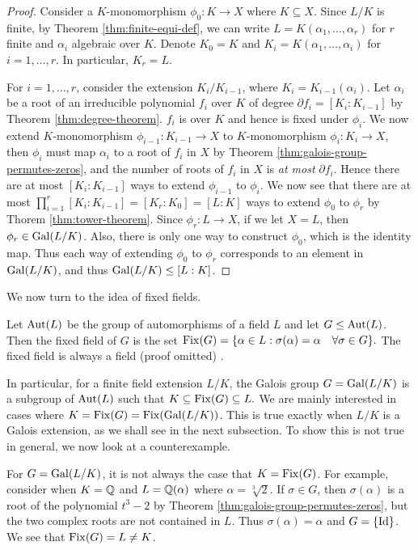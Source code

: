 \begin{proof}
	Consider a $K$-monomorphism $\phi_0 : K \to X$ where $K \subseteq X$. Since $L/K$ is finite, by Theorem \ref{thm:finite-equi-def}, we can write $L = K(\alpha_1, \ldots, \alpha_r)$ for $r$ finite and $\alpha_i$ algebraic over $K$. Denote $K_0 = K$ and
	$K_i = K(\alpha_1, \dots, \alpha_i)$ for $i = 1, \ldots, r$. In particular, $K_r = L$. 
	
	
	For $i = 1, \ldots, r$, consider the extension $K_i / K_{i-1}$, where $K_i = K_{i-1} (\alpha_i)$. Let $\alpha_i$ be a root of an irreducible polynomial $f_i$ over $K$ of degree $\partial f_i = [K_i : K_{i-1}]$ by Theorem \ref{thm:degree-theorem}. $f_i$ is over $K$ and hence is fixed under $\phi_i$. We now extend $K$-monomorphism $\phi_{i-1} : K_{i-1} \to X$ to $K$-monomorphism $\phi_i: K_i \to X$, then $\phi_i$ must map $\alpha_i$ to a root of $f_i$ in $X$ by Theorem \ref{thm:galois-group-permutes-zeros}, and the number of roots of $f_i$ in $X$ is \textit{at most} $\partial f_i$. Hence there are at most $[K_i : K_{i-1}]$ ways to extend $\phi_{i-1}$ to $\phi_i$. We now see that there are at most $\prod_{i=1} ^r [K_i : K_{i-1}] = [K_r : K_0] = [L : K]$ ways to extend $\phi_0$ to $\phi_r$ by Thorem \ref{thm:tower-theorem}. Since $\phi_r : L \to X$, if we let $X = L$, then $\phi_r \in \operatorname{Gal}(L/K)$. Also, there is only one way to construct $\phi_0$, which is the identity map. Thus each way of extending $\phi_0$ to $\phi_r$ corresponds to an element in $\operatorname{Gal}(L/K)$, and thus $\operatorname{Gal}(L/K) \le [L:K]$. 
\end{proof}



We now turn to the idea of fixed fields.
\begin{definition}
    Let $\operatorname{Aut}(L)$ be the group of automorphisms of a field $L$ and let $G \leq \operatorname{Aut}(L)$. Then the fixed field of $G$ is the set $\operatorname{Fix}(G) = \{ \alpha \in L : \sigma(\alpha) = \alpha \quad \forall \sigma \in G \}. $ The fixed field is always a field (proof omitted) \cite{morandi_field_1996}.
\end{definition}

In particular, for a finite field extension $L/ K$, the Galois group $G = \operatorname{Gal}(L / K)$ is a subgroup of $\operatorname{Aut}(L)$ such that $K \subseteq \operatorname{Fix}(G) \subseteq L. $ We are mainly interested in cases where $K = \operatorname{Fix}(G) = \operatorname{Fix}(\operatorname{Gal}(L/K))$. This is true exactly when $L/K$ is a Galois extension, as we shall see in the next subsection. To show this is not true in general, we now look at a counterexample. 

\begin{example}
    For $G = \operatorname{Gal}(L/K)$, it is not always the case that $K = \operatorname{Fix}(G)$. For example, consider when $K = \mathbb Q$ and $L = \mathbb Q (\alpha)$ where $\alpha = \sqrt[3]{2}$. If $\sigma \in G$, then $\sigma(\alpha)$ is a root of the polynomial $t^3 - 2$ by Theorem \ref{thm:galois-group-permutes-zeros}, but the two complex roots are not contained in $L$. Thus $\sigma(\alpha) = \alpha$ and $G = \{ \operatorname{Id} \}$. We see that $\operatorname{Fix}(G) = L \neq K$. 
\end{example}



